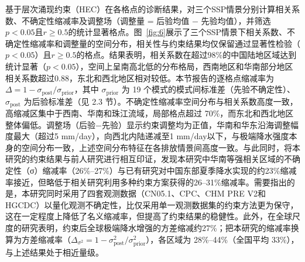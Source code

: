\documentclass[draft]{agujournal2019}
\begin{document}
基于层次涌现约束（HEC）在各格点的诊断结果，对三个SSP情景分别计算相关系数、不确定性缩减率及调整场（调整量 = 后验均值 − 先验均值），并筛选\(p<0.05\)且\(r\geq0.5\)的统计显著格点。图~\ref{fig:6}展示了三个SSP情景下相关系数、不确定性缩减率和调整量的空间分布，相关性与约束结果均仅保留通过显著性检验（\(p<0.05\)）且\(r\geq0.5\)的格点。结果表明，相关系数在超过98\%的中国陆地区域达到统计显著（\(p<0.05\)），空间上呈南高北低的分布格局，西南地区和华南部分地区相关系数超过0.88，东北和西北地区相对较低。本节报告的逐格点缩减率为 \(\Delta = 1 - \sigma_{\mathrm{post}}/\sigma_{\mathrm{prior}}\)，其中 \(\sigma_{\mathrm{prior}}\) 为 19 个模式的模式间标准差（先验不确定性）、\(\sigma_{\mathrm{post}}\) 为后验标准差（见 2.3 节）。不确定性缩减率空间分布与相关系数高度一致，高缩减区集中于西南、华南和珠江流域，局部格点超过 70\%，而东北和西北地区整体偏低。调整场（后验\(-\)先验）显示约束调整均为正值，华南和华东沿海调整幅度最大（超过5 mm/day），向西北内陆递减至1 mm/day以下，与极端降水强度本身的空间分布一致，上述空间分布特征在各排放情景间高度一致。与此同时，将本研究的约束结果与前人研究进行相互印证，发现本研究中华南等强相关区域的不确定性（σ）缩减率（26\%--27\%）与已有研究对中国东部夏季降水实现的约23\%缩减率接近\cite{zhu_improve_2024}，但略低于相关研究利用多种约束方案获得的26--31\%缩减率\cite{zhang_projections_2025}。需要指出的是，本研究同时采用了四套观测数据（CN05.1、CPC、CHM PRE V2和HGCDC）以量化观测不确定性，比仅采用单一观测数据集的约束方法更为保守，这在一定程度上降低了名义缩减率，但提高了约束结果的稳健性。此外，在全球尺度的研究表明，约束后全球极端降水增强的方差缩减约27\%\cite{paik_emergent_2023}；把本研究的缩减率换算为方差缩减率（\(\Delta_{\sigma^2} = 1 - \sigma^2_{\mathrm{post}}/\sigma^2_{\mathrm{prior}}\)），各区域为 28\%--44\%（全国平均 33\%），与上述结果处于相近量级。
\end{document}

